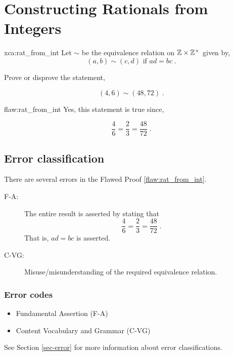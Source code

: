 \section{Constructing Rationals from Integers}

\begin{xca}{xca:rat_from_int}
Let $\sim$ be the equivalence relation on $\mathbb Z \times \mathbb Z^\times$ given by,
$$(a,b) \sim (c,d) \text{ if } ad = bc\;.$$

Prove or disprove the statement,

$$(4,6) \sim (48,72)\;.$$
\end{xca}

\begin{flaw}{flaw:rat_from_int} %
Yes, this statement is true since,

$$\frac46 = \frac23 = \frac{48}{72}\;.$$
\end{flaw}

\clearpage
\subsection{Error classification}


There are several errors
 in the Flawed Proof \ref{flaw:rat_from_int}. %

 
 \begin{description}
 	\item[F-A:] The entire result is asserted by stating that 
 	$$\frac46 = \frac23 = \frac{48}{72}\;.$$
 	That is, $ad = bc$ is asserted. 
 	\item[C-VG:] Misuse/misunderstanding of the required equivalence relation.
 \end{description}

 
\subsubsection{Error codes}
\begin{itemize}
	\item 	Fundamental Assertion (F-A)
	\item   Content Vocabulary and Grammar (C-VG)
\end{itemize}
See Section \ref{sec-error} for more information about error classifications.

